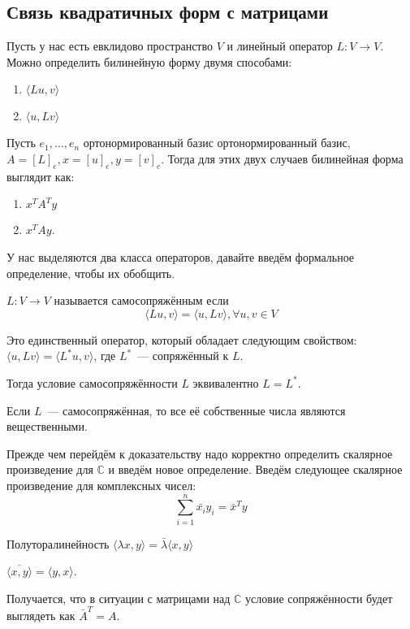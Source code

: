 \subsection{Связь квадратичных форм с матрицами}
Пусть у нас есть евклидово пространство $V$ и линейный оператор 
$L\colon V \to V$. Можно определить билинейную форму  двумя способами:
\begin{enumerate}
    \item $ \langle Lu, v \rangle$ 
    \item $\langle u, Lv \rangle$
\end{enumerate}
Пусть $e_1, \dots, e_n$ ортонормированный базис ортонормированный базис,
$A = [L]_e, x = [u]_e, y = [v]_e$.
Тогда для этих двух случаев билинейная форма выглядит как:
\begin{enumerate}
    \item $x^T A^T y$ 
    \item $x^T A y$.
\end{enumerate}
У нас выделяются два класса операторов, давайте введём формальное определение,
чтобы их обобщить.
\begin{definition}
    $L: V \to V$ называется самосопряжённым если 
    \[
        \langle Lu, v \rangle = \langle u, Lv \rangle, \forall u, v\in V
    \]
\end{definition}
\begin{remark}
    Это единственный оператор, который обладает следующим свойством:
    $\langle u, Lv \rangle = \langle L^* u, v \rangle$, где $L^*$~---
    сопряжённый к $L$.
\end{remark}
\begin{follow}
    Тогда условие самосопряжённости $L$ эквивалентно $L = L^*$.
\end{follow}

\begin{statement}
    Если $L$~--- самосопряжённая, то все её собственные числа являются
    вещественными.
\end{statement}
Прежде чем перейдём к доказательству надо корректно определить 
скалярное произведение для $\mathbb{C}$ и введём новое определение.
Введём следующее скалярное произведение для комплексных чисел:
\[
    \sum\limits_{i=1}^{n}{\bar{x_i}y_i} = \bar{x}^T y
\]

\begin{properties}
     \item Полуторалинейность 
     $\langle \lambda x, y \rangle = \bar{\lambda}\langle x, y \rangle$
     \item
     $\overline{\langle x, y \rangle} = \langle y, x \rangle$.
\end{properties}
Получается, что в ситуации с матрицами над $\mathbb{C}$ условие
сопряжённости будет выглядеть как $\bar{A}^T = A$.

